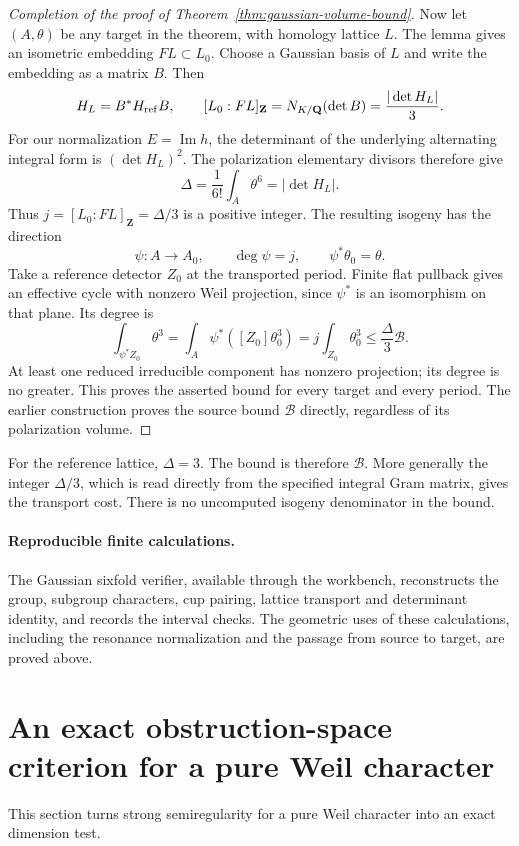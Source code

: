 \documentclass[11pt]{article}
\theoremstyle{definition}
\theoremstyle{remark}
\begin{document}
\begin{proof}[Completion of the proof of Theorem~\ref{thm:gaussian-volume-bound}]
Now let $(A,\theta)$ be any target in the theorem, with homology
lattice $L$.  The lemma gives an isometric embedding $FL\subset L_0$.
Choose a Gaussian basis of $L$ and write the embedding as a matrix $B$.
Then
\[
 H_L=B^*H_{\rm ref}B,\qquad
 [L_0:FL]_{\mathbf Z}=N_{K/\mathbf Q}(\det B)
                    =\frac{|\det H_L|}{3}.
\]
For our normalization $E=\operatorname{Im}h$, the determinant of the
underlying alternating integral form is $(\det H_L)^2$.
The polarization elementary divisors therefore give
\[
 \Delta=\frac1{6!}\int_A\theta^6
       =|\det H_L|.
\]
Thus $j=[L_0:FL]_{\mathbf Z}=\Delta/3$ is a positive integer.
The resulting isogeny has the direction
\[
 \psi:A\longrightarrow A_0,\qquad
 \deg\psi=j,\qquad\psi^*\theta_0=\theta.
\]
Take a reference detector $Z_0$ at the transported period.
Finite flat pullback gives an effective cycle with nonzero Weil
projection, since $\psi^*$ is an isomorphism on that plane.  Its degree is
\[
 \int_{\psi^*Z_0}\theta^3
  =\int_A\psi^*([Z_0]\theta_0^3)
  =j\int_{Z_0}\theta_0^3
  \le\frac{\Delta}{3}\mathcal B.
\]
At least one reduced irreducible component has nonzero projection;
its degree is no greater.  This proves the asserted bound for every
target and every period.  The earlier construction proves the source
bound $\mathcal B$ directly, regardless of its polarization volume.
\end{proof}

For the reference lattice, $\Delta=3$.  The bound is therefore
$\mathcal B$.  More generally the integer $\Delta/3$, which is
read directly from the specified integral Gram matrix, gives the
transport cost.  There is no uncomputed isogeny denominator in the
bound.

\paragraph{Reproducible finite calculations.}
The Gaussian sixfold verifier, available through the workbench,
reconstructs the group, subgroup characters, cup pairing, lattice
transport and determinant identity, and records the interval checks.
The geometric uses of these calculations, including the resonance
normalization and the passage from source to target, are proved above.

\section{An exact obstruction-space criterion for a pure Weil character}
\label{sec:pure-weil-complexes}
This section turns strong semiregularity for a pure Weil character into an exact dimension test.
\end{document}
